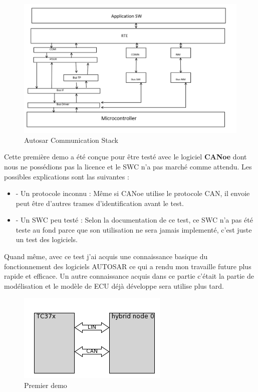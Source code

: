 \begin{figure}[!htb]
 \centering
 \includegraphics[width=\textwidth]{img/autosar_com_stack.png}
 \caption{Autosar Communication Stack}
 \label{fig:autosar-com-stack}
\end{figure}

Cette première demo a \'et\'e con\c cue pour \^etre test\'e avec le logiciel \textbf{CANoe} dont nous ne possédions pas la licence et le SWC n'a pas march\'e comme attendu. Les possibles explications sont las suivantes :

\begin{itemize}
    \item - Un protocole inconnu : Même si CANoe utilise le protocole CAN, il envoie peut \^etre d'autres trames d'identification avant le test.
    \item - Un SWC peu test\'e : Selon la documentation de ce test, ce SWC n'a pas \'et\'e teste au fond parce que son utilisation ne sera jamais implement\'e, c'est juste un test des logiciels.
\end{itemize}

Quand même, avec ce test j'ai acquis une connaissance basique du fonctionnement des logiciels AUTOSAR ce qui a rendu mon travaille future plus rapide et efficace. Un autre connaissance acquis dans ce partie c'était la partie de modélisation et le modèle de ECU déjà développe sera utilise plus tard.

\begin{figure}[!htb]
 \centering
 \includegraphics[]{img/first_demo_testbench.png}
 \caption{Premier demo}
 \label{fig:first-demo-diagram}
\end{figure}

